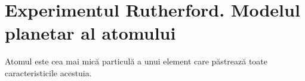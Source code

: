 \section{Experimentul Rutherford. Modelul planetar al atomului}

Atomul este cea mai mică particulă a unui element care păstrează toate
caracteristicile acestuia.
